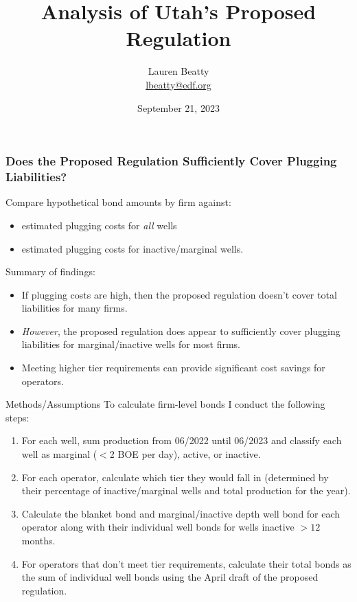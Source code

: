 \documentclass{beamer}
\title{Analysis of Utah's Proposed Regulation}
\author{Lauren Beatty\\ \href{mailto:lbeatty@edf.org}{lbeatty@edf.org}}
\institute{Environmental Defense Fund}
\date{September 21, 2023}
\begin{document}
\frame{\titlepage}

\begin{frame}
\frametitle{Does the Proposed Regulation Sufficiently Cover Plugging Liabilities?}
    Compare hypothetical bond amounts by firm against:
    \begin{itemize}
        \item estimated plugging costs for \textit{all} wells
        \item estimated plugging costs for inactive/marginal wells.
    \end{itemize}
    Summary of findings:
    \begin{itemize}
        \item If plugging costs are high, then the proposed regulation doesn't cover total liabilities for many firms.
        \item \textit{However}, the proposed regulation does appear to sufficiently cover plugging liabilities for marginal/inactive wells for most firms.
        \item Meeting higher tier requirements can provide significant cost savings for operators.
    \end{itemize}
\end{frame}

\begin{frame}{Methods/Assumptions}
\label{BondCalc}
\vspace{-0.2cm}
To calculate firm-level bonds I conduct the following steps:
\begin{enumerate}
    \item For each well, sum production from 06/2022 until 06/2023 and classify each well as marginal ($<$2 BOE per day), active, or inactive.
    \item For each operator, calculate which tier they would fall in (determined by their percentage of inactive/marginal wells and total production for the year).
    \item Calculate the blanket bond and marginal/inactive depth well bond for each operator along with their individual well bonds for wells inactive $>12$ months.
    \item For operators that don't meet tier requirements, calculate their total bonds as the sum of individual well bonds using the April draft of the proposed regulation.
\end{enumerate}
\hyperlink{bondingnumbers}{}
\end{frame}
\end{document}
